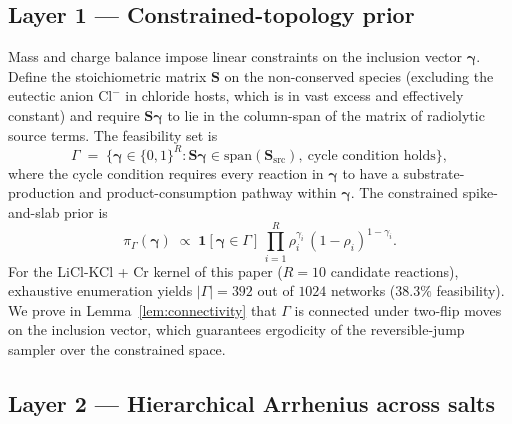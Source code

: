 \documentclass[12pt]{article}
\theoremstyle{plain}
\theoremstyle{definition}
\theoremstyle{remark}
\begin{document}
\subsection{Layer 1 --- Constrained-topology prior}\label{sec:framework:topology}

Mass and charge balance impose linear constraints on the inclusion vector
$\boldsymbol\gamma$.  Define the stoichiometric matrix $\mathbf{S}$ on the
non-conserved species (excluding the eutectic anion $\mathrm{Cl}^-$ in
chloride hosts, which is in vast excess and effectively constant) and
require $\mathbf{S}\boldsymbol\gamma$ to lie in the column-span of the
matrix of radiolytic source terms.  The feasibility set is
%
\begin{equation}
  \Gamma \;=\; \bigl\{\boldsymbol\gamma\in\{0,1\}^R :
                 \mathbf{S}\boldsymbol\gamma \in \mathrm{span}(\mathbf{S}_{\mathrm{src}}),
                 \ \text{cycle condition holds}\bigr\},
  \label{eq:Gamma}
\end{equation}
%
where the cycle condition requires every reaction in $\boldsymbol\gamma$ to
have a substrate-production and product-consumption pathway within
$\boldsymbol\gamma$.  The constrained spike-and-slab prior is
%
\begin{equation}
  \pi_\Gamma(\boldsymbol\gamma) \;\propto\;
    \mathbf{1}[\boldsymbol\gamma\in\Gamma]\,
    \prod_{i=1}^R \rho_i^{\gamma_i}\,(1-\rho_i)^{1-\gamma_i}.
  \label{eq:prior_topology}
\end{equation}
%
For the LiCl-KCl + Cr kernel of this paper ($R=10$ candidate reactions),
exhaustive enumeration yields $|\Gamma| = 392$ out of $1024$ networks
($38.3\%$ feasibility).  We prove in Lemma~\ref{lem:connectivity}
that $\Gamma$ is connected under two-flip moves on the inclusion vector,
which guarantees ergodicity of the reversible-jump sampler over the
constrained space.

\subsection{Layer 2 --- Hierarchical Arrhenius across salts}\label{sec:framework:hier}
\end{document}
